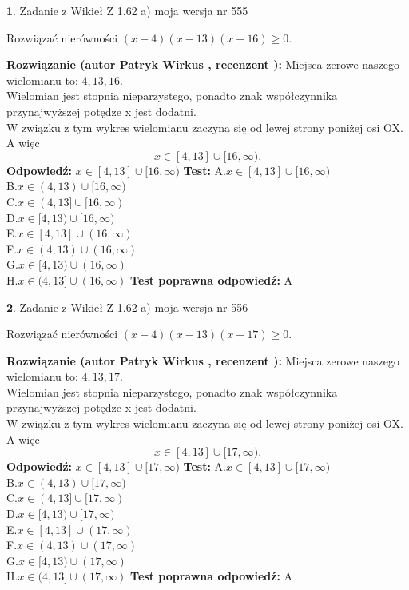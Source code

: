 \documentclass[12pt, a4paper]{article}
\theoremstyle{definition} %
\newtheorem{zad}{}
\newcommand{\zadStart}[1]{\begin{zad}#1\newline}
\newcommand{\zadStop}{\end{zad}}
\newcommand{\rozwStart}[2]{\noindent \textbf{Rozwiązanie (autor #1 , recenzent #2): }\newline}
\newcommand{\rozwStop}{\newline}
\newcommand{\odpStart}{\noindent \textbf{Odpowiedź:}\newline}
\newcommand{\odpStop}{\newline}
\newcommand{\testStart}{\noindent \textbf{Test:}\newline}
\newcommand{\testStop}{\newline}
\newcommand{\kluczStart}{\noindent \textbf{Test poprawna odpowiedź:}\newline}
\newcommand{\kluczStop}{\newline}
\begin{document}
\zadStart{Zadanie z Wikieł Z 1.62 a) moja wersja nr 555}

Rozwiązać nierówności $(x-4)(x-13)(x-16)\ge0$.
\zadStop
\rozwStart{Patryk Wirkus}{}
Miejsca zerowe naszego wielomianu to: $4, 13, 16$.\\
Wielomian jest stopnia nieparzystego, ponadto znak współczynnika przy\linebreak najwyższej potędze x jest dodatni.\\ W związku z tym wykres wielomianu zaczyna się od lewej strony poniżej osi OX. A więc $$x \in [4,13] \cup [16,\infty).$$
\rozwStop
\odpStart
$x \in [4,13] \cup [16,\infty)$
\odpStop
\testStart
A.$x \in [4,13] \cup [16,\infty)$\\
B.$x \in (4,13) \cup [16,\infty)$\\
C.$x \in (4,13] \cup [16,\infty)$\\
D.$x \in [4,13) \cup [16,\infty)$\\
E.$x \in [4,13] \cup (16,\infty)$\\
F.$x \in (4,13) \cup (16,\infty)$\\
G.$x \in [4,13) \cup (16,\infty)$\\
H.$x \in (4,13] \cup (16,\infty)$
\testStop
\kluczStart
A
\kluczStop



\zadStart{Zadanie z Wikieł Z 1.62 a) moja wersja nr 556}

Rozwiązać nierówności $(x-4)(x-13)(x-17)\ge0$.
\zadStop
\rozwStart{Patryk Wirkus}{}
Miejsca zerowe naszego wielomianu to: $4, 13, 17$.\\
Wielomian jest stopnia nieparzystego, ponadto znak współczynnika przy\linebreak najwyższej potędze x jest dodatni.\\ W związku z tym wykres wielomianu zaczyna się od lewej strony poniżej osi OX. A więc $$x \in [4,13] \cup [17,\infty).$$
\rozwStop
\odpStart
$x \in [4,13] \cup [17,\infty)$
\odpStop
\testStart
A.$x \in [4,13] \cup [17,\infty)$\\
B.$x \in (4,13) \cup [17,\infty)$\\
C.$x \in (4,13] \cup [17,\infty)$\\
D.$x \in [4,13) \cup [17,\infty)$\\
E.$x \in [4,13] \cup (17,\infty)$\\
F.$x \in (4,13) \cup (17,\infty)$\\
G.$x \in [4,13) \cup (17,\infty)$\\
H.$x \in (4,13] \cup (17,\infty)$
\testStop
\kluczStart
A
\kluczStop
\end{document}
